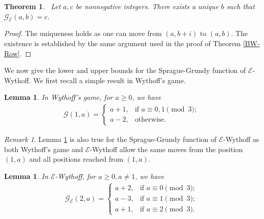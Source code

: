 \documentclass[12pt]{amsart}
\theoremstyle{plain}
\newtheorem{lemma}[proposition]{Lemma}
\newtheorem{theorem}[proposition]{Theorem}
\theoremstyle{definition}
\theoremstyle{remark}
\newtheorem{remark}{Remark}
\begin{document}
\smallskip
\begin{theorem} \label{CW-Row}\
Let $a,c$ be nonnegative integers. There exists a unique $b$ such that ${\mathcal{G}}_{\mathcal{E}}(a,b) = c$.
\end{theorem}

\begin{proof}
The uniqueness holds as one can move from $(a,b+i)$ to $(a,b)$. The existence is established by the same argument used in the proof of Theorem \ref{BW-Row}.
\end{proof}

We now give the lower and upper bounds for the Sprague-Grundy function of ${\mathcal{E}}$-Wythoff. We first recall a simple result in Wythoff's game.

\smallskip
\begin{lemma} \cite{blass} \label{CW-R1}
In Wythoff's game, for $a \geq 0$, we have
\begin{align*}
{\mathcal{G}}(1,a) =
\begin{cases}
a+1, &\text{if $a \equiv 0,1 \pmod 3$};\\
a-2, &\text{otherwise}.
\end{cases}
\end{align*}
\end{lemma}

\smallskip
\begin{remark} \label{CW-Remark1}
Lemma \ref{CW-R1} is also true for the Sprague-Grundy function of ${\mathcal{E}}$-Wythoff as both Wythoff's game and ${\mathcal{E}}$-Wythoff allow the same moves from the position $(1, a)$ and all positions reached from $(1, a)$.
\end{remark}

\smallskip
\begin{lemma} \label{CW-R2}
In ${\mathcal{E}}$-Wythoff, for $a \geq 0, a \neq 1$, we have
\begin{align*}
{\mathcal{G}}_{\mathcal{E}}(2,a) =
\begin{cases}
a+2, &\text{if $a \equiv 0 \pmod 3$};\\
a-3, &\text{if $a \equiv 1 \pmod 3$};\\
a+1, &\text{if $a \equiv 2 \pmod 3$}.
\end{cases}
\end{align*}
\end{lemma}
\end{document}
